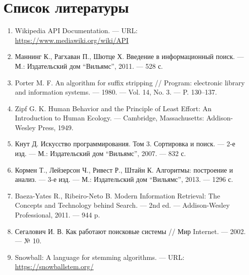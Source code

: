 \documentclass[a4paper,12pt]{article}
\begin{document}
\section{Список литературы}
\begin{enumerate}
    \item Wikipedia API Documentation. --- URL: \url{https://www.mediawiki.org/wiki/API}
    
    \item Маннинг К., Рагхаван П., Шютце Х. Введение в информационный поиск. --- М.: Издательский дом \enquote{Вильямс}, 2011. --- 528 с.
    
    \item Porter M. F. An algorithm for suffix stripping // Program: electronic library and information systems. --- 1980. --- Vol. 14, No. 3. --- P. 130--137.
    
    \item Zipf G. K. Human Behavior and the Principle of Least Effort: An Introduction to Human Ecology. --- Cambridge, Massachusetts: Addison-Wesley Press, 1949.
    
    \item Кнут Д. Искусство программирования. Том 3. Сортировка и поиск. --- 2-е изд. --- М.: Издательский дом \enquote{Вильямс}, 2007. --- 832 с.
    
    \item Кормен Т., Лейзерсон Ч., Ривест Р., Штайн К. Алгоритмы: построение и анализ. --- 3-е изд. --- М.: Издательский дом \enquote{Вильямс}, 2013. --- 1296 с.
    
    \item Baeza-Yates R., Ribeiro-Neto B. Modern Information Retrieval: The Concepts and Technology behind Search. --- 2nd ed. --- Addison-Wesley Professional, 2011. --- 944 p.
    
    \item Сегалович И. В. Как работают поисковые системы // Мир Internet. --- 2002. --- № 10.
    
    \item Snowball: A language for stemming algorithms. --- URL: \url{https://snowballstem.org/}
    
\end{enumerate}
\end{document}
